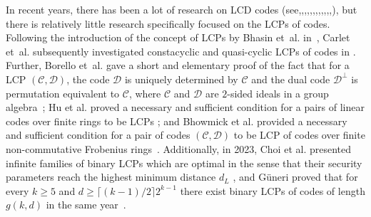 \documentclass[journal,12pt,onecolumn]{IEEEtran}
\begin{document}
In recent years, there has been a lot of research on LCD codes (see\cite{ComplementaryDualAGC},\cite{ARAYA2019270},\cite{arayaMinimumWeightsBinary2020},\cite{arayaCharacterizationClassificationOptimal2021},\cite{ARAYA2021101925},\cite{bouyuklievaOptimalBinaryLCD2021},\cite{doi:10.1142/S0129054119500242},\cite{galvezBoundsBinaryLCD2018},\cite{haradaBinaryLinearComplementary2019},\cite{haradaConstructionBinaryLCD2021},\cite{KeitaIshizuka2023AdvancesinMathematicsCommunications},\cite{7797200},\cite{liSeveralConstructionsOptimal2024}), but there is relatively little research specifically focused on the LCPs of codes. Following the introduction of the concept of LCPs by Bhasin et~al. in~\cite{Linear_complementary_dual_code_improvement_to_strengthen_encoded_circui_tagainst_hardware_Trojan_horses}, Carlet et~al. subsequently investigated constacyclic and quasi-cyclic LCPs of codes in \cite{carletLinearComplementaryPairs2018}. Further, Borello et~al. gave a short and elementary proof of the fact that for a LCP $(\mathcal{C},\mathcal{D})$, the code $\mathcal{D}$ is uniquely determined by $\mathcal{C}$ and the dual code $\mathcal{D}^\perp$ is permutation equivalent to $\mathcal{C}$, where $\mathcal{C}$ and $\mathcal{D}$ are $2$-sided ideals in a group algebra~\cite{BORELLO2020111905}; Hu et al. proved a necessary and sufficient condition for a pairs of linear codes
over finite rings to be LCPs \cite{huLinearComplementaryPairs2021}; and Bhowmick et al. provided a necessary and sufficient condition for a pair of codes $(\mathcal{C},\mathcal{D})$ to be LCP of codes over finite non-commutative Frobenius rings~\cite{bhowmickLinearComplementaryPairs2024a}. Additionally, in 2023, Choi et al. presented infinite families of binary LCPs which are optimal in the sense that their security parameters reach the highest minimum distance $d_L$ \cite{choiOptimalBinaryLinear2023}, and Güneri proved that for every $k\ge5$ and $d\ge \lceil(k-1)/2\rceil 2^{k-1}$ there exist binary LCPs of codes of length $g(k,d)$ in the same year~\cite{10156864}. 
\end{document}
